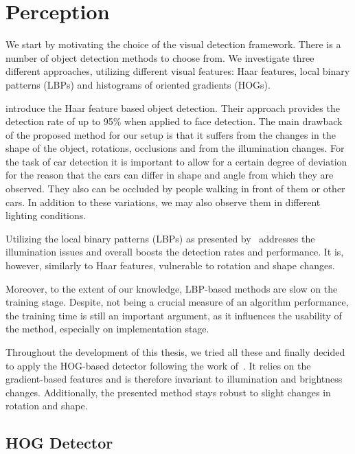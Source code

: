 
\section{Perception} %
\label{sec:perception}

We start by motivating the choice of the visual detection framework. There is
a number of object detection methods to choose from. We investigate three
different approaches, utilizing different visual features: Haar features,
local binary patterns (LBPs) and histograms of oriented gradients (HOGs).

\citet{violajones2001} introduce the Haar feature based object detection.
Their approach provides the detection rate of up to 95\% when applied to face
detection. The main drawback of the proposed method for our setup is that it
suffers from the changes in the shape of the object, rotations, occlusions and
from the illumination changes. For the task of car detection it is important
to allow for a certain degree of deviation for the reason that the cars can
differ in shape and angle from which they are observed. They also can be
occluded by people walking in front of them or other cars. In addition to
these variations, we may also observe them in different lighting conditions.

Utilizing the local binary patterns (LBPs) as presented by~\citet{lbp2010}
addresses the illumination issues and overall boosts the detection rates and
performance. It is, however, similarly to Haar features, vulnerable to
rotation and shape changes.

Moreover, to the extent of our knowledge, LBP-based methods are slow on the
training stage. Despite, not being a crucial measure of an algorithm
performance, the training time is still an important argument, as it
influences the usability of the method, especially on implementation stage.

Throughout the development of this thesis, we tried all these and finally
decided to apply the HOG-based detector following the work
of~\citet{dalal2005}. It relies on the gradient-based features and is
therefore invariant to illumination and brightness changes. Additionally, the
presented method stays robust to slight changes in rotation and shape.

\subsection{HOG Detector}\label{sub:hog_detector}

